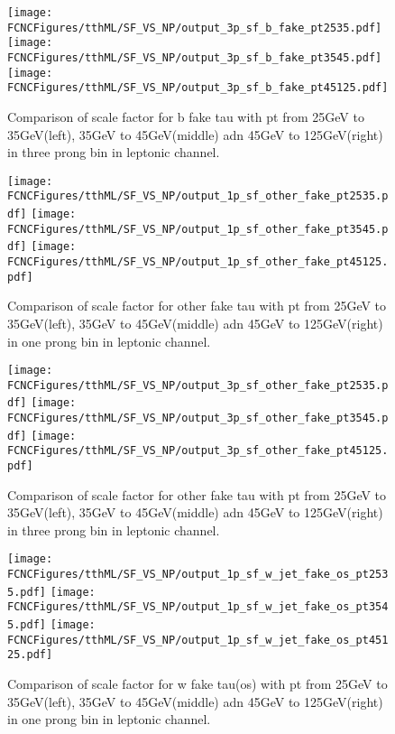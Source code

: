 \begin{figure}[H]
\centering
\texttt{[image: \\FCNCFigures/tthML/SF\_VS\_NP/output\_3p\_sf\_b\_fake\_pt2535.pdf]}
\texttt{[image: \\FCNCFigures/tthML/SF\_VS\_NP/output\_3p\_sf\_b\_fake\_pt3545.pdf]}
\texttt{[image: \\FCNCFigures/tthML/SF\_VS\_NP/output\_3p\_sf\_b\_fake\_pt45125.pdf]}
\\
\caption{Comparison of scale factor for b fake tau with pt from 25GeV to 35GeV(left), 35GeV to 45GeV(middle) adn 45GeV to 125GeV(right) in three prong bin in leptonic channel.}
\label{fig:3p_sf_b_fake_pt2535}
\end{figure}
	





\begin{figure}[H]
\centering
\texttt{[image: \\FCNCFigures/tthML/SF\_VS\_NP/output\_1p\_sf\_other\_fake\_pt2535.pdf]}	
\texttt{[image: \\FCNCFigures/tthML/SF\_VS\_NP/output\_1p\_sf\_other\_fake\_pt3545.pdf]}	
\texttt{[image: \\FCNCFigures/tthML/SF\_VS\_NP/output\_1p\_sf\_other\_fake\_pt45125.pdf]}
\\
\caption{Comparison of scale factor for other fake tau with pt from 25GeV to 35GeV(left), 35GeV to 45GeV(middle) adn 45GeV to 125GeV(right) in one prong bin in leptonic channel.}
\label{fig:1p_sf_b_fake_pt2535}
\end{figure}

\begin{figure}[H]
\centering
\texttt{[image: \\FCNCFigures/tthML/SF\_VS\_NP/output\_3p\_sf\_other\_fake\_pt2535.pdf]}
\texttt{[image: \\FCNCFigures/tthML/SF\_VS\_NP/output\_3p\_sf\_other\_fake\_pt3545.pdf]}
\texttt{[image: \\FCNCFigures/tthML/SF\_VS\_NP/output\_3p\_sf\_other\_fake\_pt45125.pdf]}
\\
\caption{Comparison of scale factor for other fake tau with pt from 25GeV to 35GeV(left), 35GeV to 45GeV(middle) adn 45GeV to 125GeV(right) in three prong bin in leptonic channel.}
\label{fig:3p_sf_b_fake_pt2535}
\end{figure}





\begin{figure}[H]
\centering
\texttt{[image: \\FCNCFigures/tthML/SF\_VS\_NP/output\_1p\_sf\_w\_jet\_fake\_os\_pt2535.pdf]}
\texttt{[image: \\FCNCFigures/tthML/SF\_VS\_NP/output\_1p\_sf\_w\_jet\_fake\_os\_pt3545.pdf]}
\texttt{[image: \\FCNCFigures/tthML/SF\_VS\_NP/output\_1p\_sf\_w\_jet\_fake\_os\_pt45125.pdf]}
\\
\caption{Comparison of scale factor for w fake tau(os) with pt from 25GeV to 35GeV(left), 35GeV to 45GeV(middle) adn 45GeV to 125GeV(right) in one prong bin in leptonic channel.}
\label{fig:1p_sf_b_fake_pt2535}
\end{figure}

